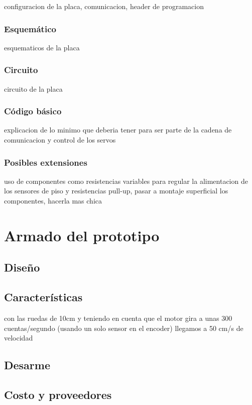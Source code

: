 configuracion de la placa, comunicacion, header de programacion

\subsubsection{Esquem\'atico}
\label{h_placas_servos_esquematico}

esquematicos de la placa

\subsubsection{Circuito}
\label{h_placas_servos_circuito}

circuito de la placa

\subsubsection{C\'odigo b\'asico}
\label{h_placas_servos_codigo}

explicacion de lo minimo que deberia tener para ser parte de la cadena de comunicacion y control de los servos

\subsubsection{Posibles extensiones}
\label{h_placas_servos_extensiones}

uso de componentes como resistencias variables para regular la alimentacion de los sensores de piso y resistencias pull-up, pasar a montaje superficial los componentes, hacerla mas chica

\section{Armado del prototipo}
\label{h_prototipo}

\subsection{Dise\~no}
\label{h_prototipo_diseno}

\subsection{Caracter\'isticas}
\label{h_prototipo_caracteristicas}

con las ruedas de 10cm y teniendo en cuenta que el motor gira a unas 300 cuentas/segundo (usando un solo sensor en el encoder) llegamos a 50 cm/s de velocidad

\subsection{Desarme}
\label{h_prototipo_desarme}

\subsection{Costo y proveedores}
\label{h_prototipo_costo}
